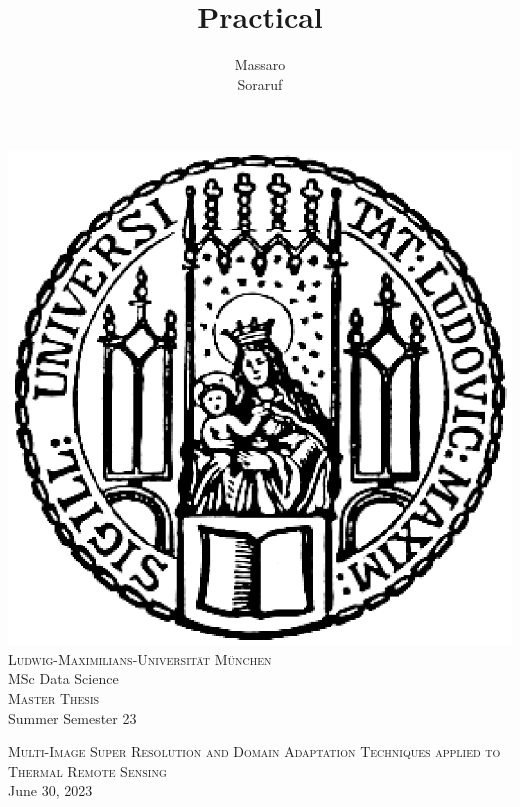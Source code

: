 \documentclass[11pt]{article}
\title{Practical}
\author{Massaro\\ Soraruf}
\numberwithin{equation}{section}
\numberwithin{figure}{section}
\numberwithin{table}{section}
\begin{document}
%
%
\pagestyle{fancy}
\renewcommand{\sectionmark}[1]{\markboth{}{\thesection\ \ #1}}
\lhead{}
\chead{}
\rhead{\rightmark}
\lfoot{}
\cfoot{}
\rfoot{\thepage}

%
%
\begin{titlepage}

\thispagestyle{empty}

\begin{center}
\includegraphics[scale=0.5]{Includes/0-siegel.eps}\\
\large{\textsc{Ludwig-Maximilians-Universität München}}\\
\large{MSc Data Science }\\
{\textsc{Master Thesis}} \\ 
\vspace{0.5cm}
\small{Summer Semester 23 }
\end{center}

\vspace{2cm}

\begin{center}
\Large{\textsc{ Multi-Image Super Resolution and Domain Adaptation Techniques applied to Thermal Remote Sensing}} \\
June 30, 2023
\end{center}


\end{titlepage}
\end{document}
